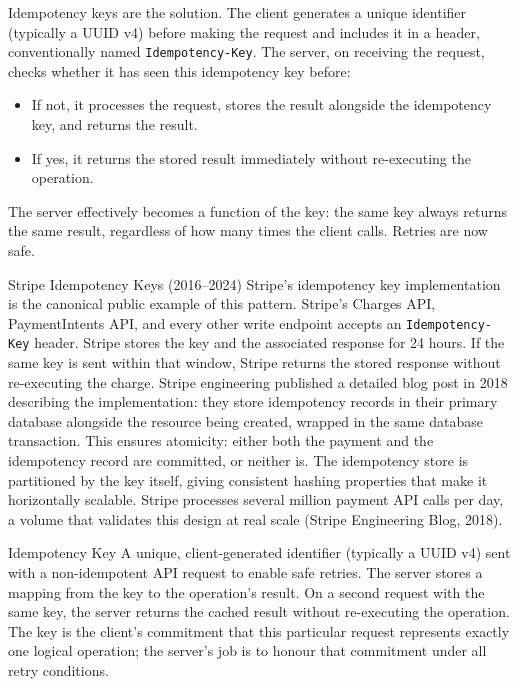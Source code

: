 \documentclass[11pt,a4paper]{article}
\begin{document}
Idempotency keys are the solution. The client generates a unique identifier (typically a UUID v4) before making the request and includes it in a header, conventionally named \texttt{Idempotency-Key}. The server, on receiving the request, checks whether it has seen this idempotency key before:

\begin{itemize}
  \item If not, it processes the request, stores the result alongside the idempotency key, and returns the result.
  \item If yes, it returns the stored result immediately without re-executing the operation.
\end{itemize}

The server effectively becomes a function of the key: the same key always returns the same result, regardless of how many times the client calls. Retries are now safe.

\begin{industrybox}{Stripe Idempotency Keys (2016--2024)}
Stripe's idempotency key implementation is the canonical public example of this pattern. Stripe's Charges API, PaymentIntents API, and every other write endpoint accepts an \texttt{Idempotency-Key} header. Stripe stores the key and the associated response for 24 hours. If the same key is sent within that window, Stripe returns the stored response without re-executing the charge. Stripe engineering published a detailed blog post in 2018 describing the implementation: they store idempotency records in their primary database alongside the resource being created, wrapped in the same database transaction. This ensures atomicity: either both the payment and the idempotency record are committed, or neither is. The idempotency store is partitioned by the key itself, giving consistent hashing properties that make it horizontally scalable. Stripe processes several million payment API calls per day, a volume that validates this design at real scale (Stripe Engineering Blog, 2018).
\end{industrybox}

\begin{termbox}{Idempotency Key}
A unique, client-generated identifier (typically a UUID v4) sent with a non-idempotent API request to enable safe retries. The server stores a mapping from the key to the operation's result. On a second request with the same key, the server returns the cached result without re-executing the operation. The key is the client's commitment that this particular request represents exactly one logical operation; the server's job is to honour that commitment under all retry conditions.
\end{termbox}
\end{document}
